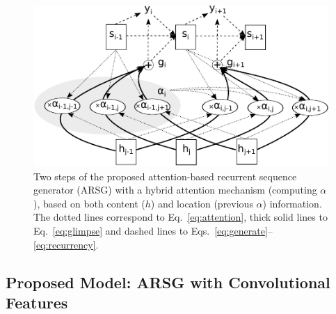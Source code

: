 \documentclass{article} %
\begin{document}
\begin{figure}
    \centering
    \hfill
    \begin{minipage}{0.6\textwidth}
        \centering
        \includegraphics[width=0.95\columnwidth]{model.pdf}
    \end{minipage}
    \begin{minipage}{0.38\textwidth}
        \caption{
            Two steps of the proposed attention-based recurrent sequence
            generator (ARSG) with a hybrid attention mechanism (computing $\alpha$), based on
            both content ($h$) and location (previous $\alpha$) information.
            The dotted lines correspond to Eq.~\eqref{eq:attention}, thick solid
            lines to Eq.~\eqref{eq:glimpse} and dashed lines to
            Eqs.~\eqref{eq:generate}--\eqref{eq:recurrency}.
        }
        \label{fig:model}
    \end{minipage}
    \hfill

  \vspace{-4mm}
\end{figure}    

\subsection{Proposed Model: ARSG with Convolutional Features}
\end{document}
